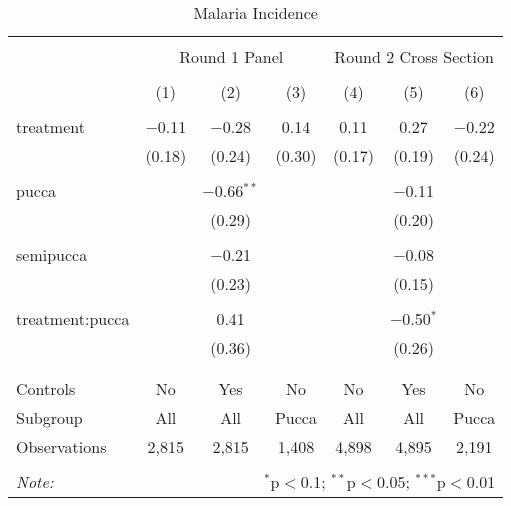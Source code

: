 
\begin{table}[!htbp] \centering 
  \caption{Malaria Incidence} 
  \label{tbl:Malaria Incidence} 
\begin{tabular}{@{\extracolsep{5pt}}lcccccc} 
\\[-1.8ex]\hline 
\hline \\[-1.8ex] 
 & \multicolumn{3}{c}{Round 1 Panel} & \multicolumn{3}{c}{Round 2 Cross Section} \\ 
\\[-1.8ex] & (1) & (2) & (3) & (4) & (5) & (6)\\ 
\hline \\[-1.8ex] 
 treatment & $-$0.11 & $-$0.28 & 0.14 & 0.11 & 0.27 & $-$0.22 \\ 
  & (0.18) & (0.24) & (0.30) & (0.17) & (0.19) & (0.24) \\ 
  & & & & & & \\ 
 pucca &  & $-$0.66$^{**}$ &  &  & $-$0.11 &  \\ 
  &  & (0.29) &  &  & (0.20) &  \\ 
  & & & & & & \\ 
 semipucca &  & $-$0.21 &  &  & $-$0.08 &  \\ 
  &  & (0.23) &  &  & (0.15) &  \\ 
  & & & & & & \\ 
 treatment:pucca &  & 0.41 &  &  & $-$0.50$^{*}$ &  \\ 
  &  & (0.36) &  &  & (0.26) &  \\ 
  & & & & & & \\ 
\hline \\[-1.8ex] 
Controls & No & Yes & No & No & Yes & No \\ 
Subgroup & All & All & Pucca & All & All & Pucca \\ 
Observations & 2,815 & 2,815 & 1,408 & 4,898 & 4,895 & 2,191 \\ 
\hline 
\hline \\[-1.8ex] 
\textit{Note:}  & \multicolumn{6}{r}{$^{*}$p$<$0.1; $^{**}$p$<$0.05; $^{***}$p$<$0.01} \\ 
\end{tabular} 
\end{table} 
